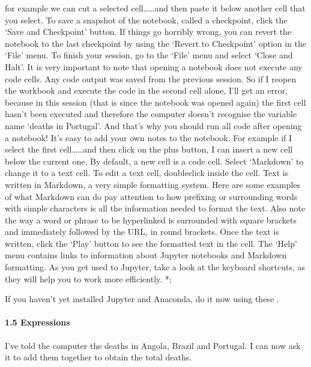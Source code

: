 \documentclass[letterpaper,10pt,english]{sphinxmanual}
\let\sphinxpxdimen\pdfpxdimen\else\newdimen\sphinxpxdimen
\begin{document}
for example we can cut a selected cell……and then paste it below another cell that you select. To save a snapshot of the notebook, called a checkpoint, click the ‘Save and Checkpoint’ button. \sphinxstyleemphasis{;} If things go horribly wrong, you can revert the notebook to the last checkpoint by using the ‘Revert to Checkpoint’ option in the ‘File’ menu. To finish your session, go to the ‘File’ menu and select ‘Close and Halt’. It is very important to note that opening a notebook does not execute any code cells.
Any code output was saved from the previous session. So if I reopen the workbook and execute the code in the second cell alone, I’ll get an error, because in this session (that is since the notebook was opened again) the first cell hasn’t been executed and therefore the computer doesn’t recognise the variable name ‘deaths in Portugal’. And that’s why you should run all code after opening a notebook! \sphinxstyleemphasis{;} It’s easy to add your own notes to the notebook. For example if I select the first cell……and
then click on the plus button, I can insert a new cell below the current one. By default, a new cell is a code cell. Select ‘Markdown’ to change it to a text cell. To edit a text cell, double\sphinxhyphen{}click inside the cell. Text is written in Markdown, a very simple formatting system. Here are some examples of what Markdown can do \sphinxhyphen{} pay attention to how prefixing or surrounding words with simple characters is all the information needed to format the text. \sphinxstyleemphasis{;} Also note the way a word or phrase to be
hyperlinked is surrounded with square brackets and immediately followed by the URL, in round brackets. Once the text is written, click the ‘Play’ button to see the formatted text in the cell. The ‘Help’ menu contains links to information about Jupyter notebooks and Markdown formatting. As you get used to Jupyter, take a look at the keyboard shortcuts, as they will help you to work more efficiently. *;









\sphinxincludegraphics[width=512\sphinxpxdimen,height=288\sphinxpxdimen]{{ou_futurelearn_learn_to_code_vid_1046}.jpg}

If you haven’t yet installed Jupyter and Anaconda, do it now using these .


\paragraph{1.5 Expressions}
\label{\detokenize{content/session_01/Part_01_02:1.5-Expressions}}
I’ve told the computer the deaths in Angola, Brazil and Portugal. I can now ask it to add them together to obtain the total deaths.
\end{document}
